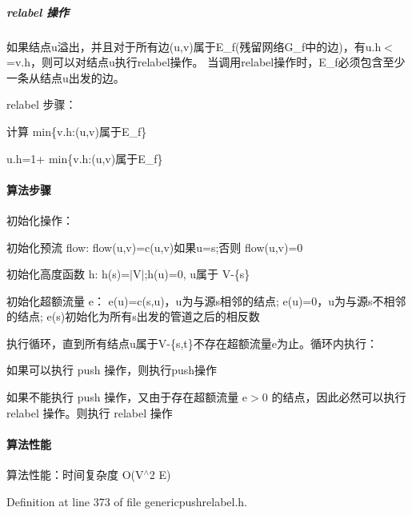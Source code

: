 \subparagraph*{relabel 操作}

如果结点u溢出，并且对于所有边(u,v)属于\+E\+\_\+f(残留网络\+G\+\_\+f中的边)，有u.\+h$<$=v.\+h，则可以对结点u执行relabel操作。 当调用relabel操作时，\+E\+\_\+f必须包含至少一条从结点u出发的边。

relabel 步骤：


\begin{DoxyItemize}
\item 计算 min\{v.\+h\+:(u,v)属于\+E\+\_\+f\}
\item u.\+h=1+ min\{v.\+h\+:(u,v)属于\+E\+\_\+f\}
\end{DoxyItemize}

\paragraph*{算法步骤}


\begin{DoxyItemize}
\item 初始化操作：
\begin{DoxyItemize}
\item 初始化预流 flow\+: flow(u,v)=c(u,v)如果u=s;否则 flow(u,v)=0
\item 初始化高度函数 h\+: h(s)=$\vert$\+V$\vert$;h(u)=0, u属于 V-\/\{s\}
\item 初始化超额流量 e： e(u)=c(s,u)，u为与源s相邻的结点; e(u)=0，u为与源s不相邻的结点; e(s)初始化为所有s出发的管道之后的相反数
\end{DoxyItemize}
\item 执行循环，直到所有结点u属于\+V-\/\{s,t\}不存在超额流量e为止。循环内执行：
\begin{DoxyItemize}
\item 如果可以执行 push 操作，则执行push操作
\item 如果不能执行 push 操作，又由于存在超额流量 e$>$0 的结点，因此必然可以执行 relabel 操作。则执行 relabel 操作
\end{DoxyItemize}
\end{DoxyItemize}

\paragraph*{算法性能}

算法性能：时间复杂度 O(\+V$^\wedge$2 E) 

Definition at line 373 of file genericpushrelabel.\+h.

\hypertarget{namespace_introduction_to_algorithm_1_1_graph_algorithm_a1581960f77507024b39572aeb6d1fbd6}{}
